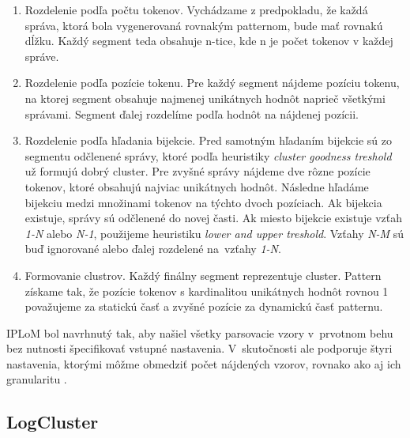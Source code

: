 \begin{enumerate}
  \item Rozdelenie podľa počtu tokenov. Vychádzame z predpokladu, že každá správa, ktorá bola vygenerovaná rovnakým patternom, bude mať rovnakú dĺžku. Každý segment teda obsahuje n-tice, kde n je počet tokenov v každej správe.
  \item Rozdelenie podľa pozície tokenu. Pre každý segment nájdeme pozíciu tokenu, na ktorej segment obsahuje najmenej unikátnych hodnôt naprieč všetkými správami. Segment ďalej rozdelíme podľa hodnôt na nájdenej pozícii.
  \item Rozdelenie podľa hľadania bijekcie. Pred samotným hľadaním bijekcie sú zo segmentu odčlenené správy, ktoré podľa heuristiky \emph{cluster goodness treshold} už formujú dobrý cluster. Pre zvyšné správy nájdeme dve rôzne pozície tokenov, ktoré obsahujú naj\-viac unikátnych hodnôt. Následne hľadáme bijekciu medzi mno\-žinami tokenov na týchto dvoch pozíciach. Ak bijekcia existuje, správy sú odčlenené do novej časti. Ak miesto bijekcie existuje vzťah \emph{1-N} alebo \emph{N-1}, použijeme heuristiku \emph{lower and upper treshold}. Vzťahy \emph{N-M} sú buď ignorované alebo ďalej rozdelené na~vzťahy \emph{1-N}.
  \item Formovanie clustrov. Každý finálny segment reprezentuje cluster. Pattern získame tak, že pozície tokenov s kardinalitou unikátnych hodnôt rovnou 1 považujeme za statickú časť a zvyšné pozície za dynamickú časť patternu.
\end{enumerate}

IPLoM bol navrhnutý tak, aby našiel všetky parsovacie vzory v~prvotnom behu bez nutnosti špecifikovať vstupné nastavenia. V~skutočnosti ale podporuje štyri nastavenia, ktorými môžme obmedziť počet nájdených vzorov, rovnako ako aj ich granularitu \parencite{nagappanvouk}.

\subsection{LogCluster}

